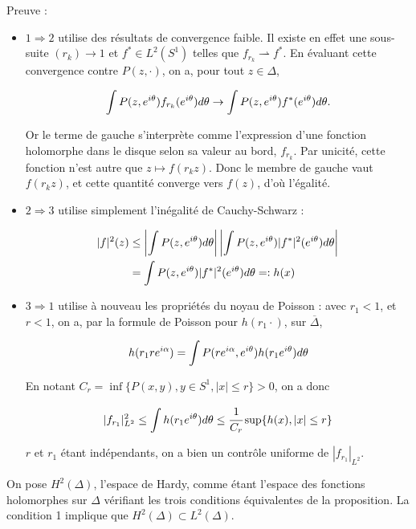Preuve : \begin{itemize}
\item $1 \Rightarrow 2$ utilise des résultats de convergence faible. Il existe en effet une sous-suite $(r_k) \to 1$ et $f^* \in L^2(S^1)$ telles que $f_{r_k} \rightharpoonup f^*$. En évaluant cette convergence contre $P(z, \cdot)$, on a, pour tout $z \in \Delta$, 

\begin{equation*}
	\int P(z,e^{i\theta})f_{r_k}(e^{i\theta})d\theta \to \int P(z,e^{i\theta})f^*(e^{i\theta})d\theta.
\end{equation*}

Or le terme de gauche s'interprète comme l'expression d'une fonction holomorphe dans le disque selon sa valeur au bord, $f_{r_k}$. Par unicité, cette fonction n'est autre que $z \mapsto f(r_kz)$. Donc le membre de gauche vaut $f(r_k z)$, et cette quantité converge vers $f(z)$, d'où l'égalité.
\item $2 \Rightarrow 3$ utilise simplement l'inégalité de Cauchy-Schwarz :

\begin{align*}
	|f|^2(z) &\leq \left|\int P(z,e^{i\theta})d\theta \right| \left|\int P(z,e^{i\theta})|f^*|^2(e^{i\theta})d\theta\right|\\
	&= \int P(z,e^{i\theta})|f^*|^2(e^{i\theta})d\theta =: h(x)
\end{align*}

\item $3 \Rightarrow 1$ utilise à nouveau les propriétés du noyau de Poisson : avec $r_1 < 1$, et $r < 1$, on a, par la formule de Poisson pour $h(r_1 \cdot)$, sur $\overline{\Delta}$, 

\begin{equation*}
	h(r_1re^{i\alpha})=\int P(re^{i\alpha}, e^{i\theta})h(r_1e^{i\theta})d\theta
\end{equation*}

En notant $C_r = \inf\{P(x,y), y\in S^1, |x| \leq r\} > 0$, on a donc 

\begin{equation*}
	|f_{r_1}|_{L^2}^2 \leq \int h(r_1 e^{i\theta})d\theta \leq \cfrac{1}{C_r}\sup\{h(x), |x| \leq r\}
\end{equation*}

$r$ et $r_1$ étant indépendants, on a bien un contrôle uniforme de $|f_{r_1}|_{L^2}$.
\end{itemize}

On pose $H^2(\Delta)$, l'espace de Hardy, comme étant l'espace des fonctions holomorphes sur $\Delta$ vérifiant les trois conditions équivalentes de la proposition. La condition 1 implique que $H^2(\Delta) \subset L^2(\Delta)$. 

